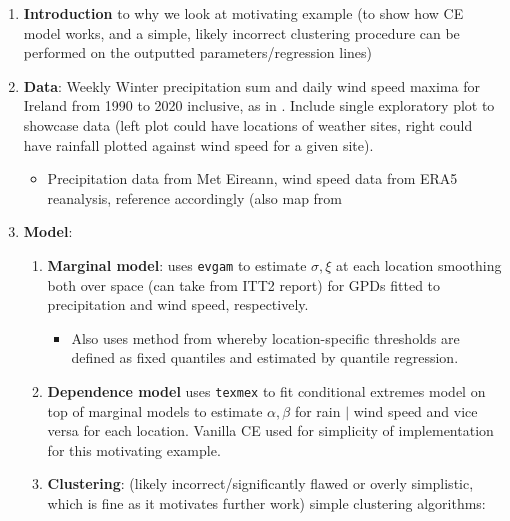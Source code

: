 \documentclass{article}
\numberwithin{equation}{section}
\begin{document}
\begin{enumerate}
  \item \textbf{Introduction} to why we look at motivating example (to show how CE model works, and a simple, likely incorrect clustering procedure can be performed on the outputted parameters/regression lines) 
  \item \textbf{Data}: Weekly Winter precipitation sum and daily wind speed maxima for Ireland from 1990 to 2020 inclusive, 
    as in \cite{Vignotto2021}. Include single exploratory plot to showcase data (left plot could have locations of weather sites, right could have rainfall plotted against wind speed for a given site).
  \begin{itemize}
    \item Precipitation data from Met Eireann, wind speed data from ERA5 reanalysis, reference accordingly (also map from 
  \end{itemize}
  \item \textbf{Model}:
    \begin{enumerate}
      \item \textbf{Marginal model}: uses \texttt{evgam} to estimate $\sigma, \xi$ at each location smoothing both over space (can take from ITT2 report) for GPDs fitted to precipitation and wind speed, respectively.
      \begin{itemize}
        \item Also uses method from \cite{Youngman2019} whereby location-specific thresholds are defined as fixed quantiles and estimated by quantile regression.
      \end{itemize}
      \item \textbf{Dependence model} uses \texttt{texmex} to fit conditional extremes model on top of marginal models to estimate $\alpha, \beta$ for rain $\mid$ wind speed and vice versa for each location. 
        Vanilla CE used for simplicity of implementation for this motivating example. 
      \item \textbf{Clustering}: (likely incorrect/significantly flawed or overly simplistic, which is fine as it motivates further work) simple clustering algorithms:
        \begin{itemize}

\end{itemize}
\end{enumerate}
\end{enumerate}
\end{document}
